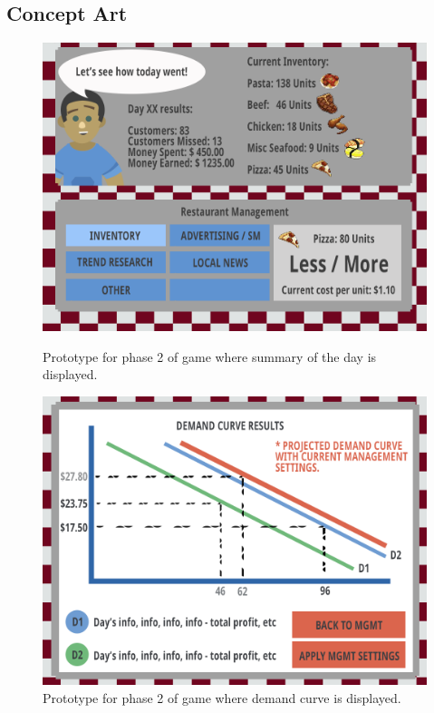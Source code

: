 \documentclass{article}
\begin{document}
\subsection{Concept Art}
\begin{figure}[h!]
\centering
\includegraphics[scale=0.3]{scene2.png}
\caption{Prototype for phase 2 of game where summary of the day is displayed.}
\vspace{5mm}
\includegraphics[scale=0.3]{scene2_report.png}
\caption{Prototype for phase 2 of game where demand curve is displayed.}

\end{figure}
\end{document}
